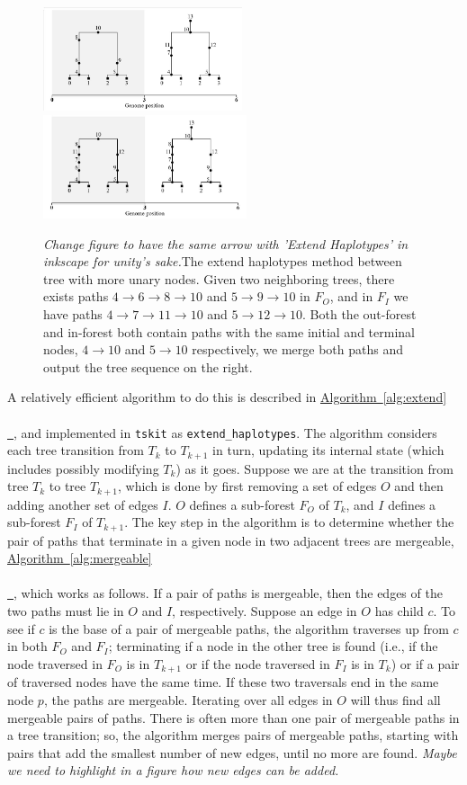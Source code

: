 \documentclass[10pt,twoside,lineno]{gsajnl}
\newcommand{\tskit}{\texttt{tskit}}
\newcommand{\comment}[1]{{\color{violet} \it #1}}
\newcommand{\algorithmref}[2][]{%
	\hyperref[{#2}]{%
		Algorithm~\ref*{#2}%
		\ifx\\#1\\%
		\else
		\,#1%
		\fi
	}%
}
\begin{document}
\begin{figure}[!ht]
	\begin{center}
		\includegraphics[width=0.4\linewidth, height=1.2in]{EH-Ex2.pdf}
		\includegraphics[width=0.4\linewidth, height=1.2in]{EH-extended-Ex2.pdf}
	\end{center}
	\caption{\comment{Change figure to have the same arrow with 'Extend Haplotypes' in inkscape for unity's sake.}The extend haplotypes method between tree with more unary nodes. Given two neighboring trees, there exists paths $4\to 6\to8\to10$ and $5\to 9\to 10$ in $F_O$, and in $F_I$ we have paths $4\to 7\to 11\to 10$ and $5\to 12\to 10$. Both the out-forest and in-forest both contain paths with the same initial and terminal nodes, $4\to 10$ and $5\to 10$ respectively, we merge both paths and output the tree sequence on the right.}
	\label{fig:complicated_extending_diagram}
\end{figure}

A relatively efficient algorithm to do this is described in \algorithmref{alg:extend}, 
and implemented in \tskit{} as \texttt{extend\_haplotypes}.
The algorithm considers each tree transition from $T_k$ to $T_{k+1}$ in turn, updating its internal state
(which includes possibly modifying $T_k$) as it goes.
Suppose we are at the transition from tree $T_k$ to tree $T_{k+1}$,
which is done by first removing a set of edges $O$
and then adding another set of edges $I$.
$O$ defines a sub-forest $F_O$ of $T_k$,
and $I$ defines a sub-forest $F_I$ of $T_{k+1}$.
The key step in the algorithm is to determine whether the pair of paths
that terminate in a given node in two adjacent trees are mergeable,
\algorithmref{alg:mergeable}, which works as follows.
If a pair of paths is mergeable,
then the edges of the two paths must lie in $O$ and $I$, respectively.
Suppose an edge in $O$ has child $c$.
To see if $c$ is the base of a pair of mergeable paths,
the algorithm traverses up from $c$ in both $F_O$ and $F_I$;
terminating if a node in the other tree is found
(i.e., if the node traversed in $F_O$ is in $T_{k+1}$ or if the node traversed in $F_I$ is in $T_k$)
or if a pair of traversed nodes have the same time.
If these two traversals end in the same node $p$, the paths are mergeable.
Iterating over all edges in $O$ will thus find all mergeable pairs of paths.
There is often more than one pair of mergeable paths in a tree transition;
so, the algorithm merges pairs of mergeable paths,
starting with pairs that add the smallest number of new edges,
until no more are found.
\comment{Maybe we need to highlight in a figure how new edges can be added.}
\end{document}
